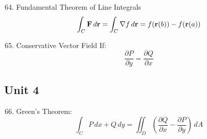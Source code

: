\documentclass[12pt]{article}
\begin{document}
\begin{enumerate}
    \setcounter{enumi}{63}

  \item Fundamental Theorem of Line Integrals
    $$\int_C \bold{F}\,d\bold{r}=\int_C \nabla f\,d\bold{r}=f(\bold{r}(b))-f(\bold{r}(a))$$

  \item Conservative Vector Field If:
    $$\frac{\partial P}{\partial y}=\frac{\partial Q}{\partial x}$$

\end{enumerate}

\subsection{Unit 4}

\begin{enumerate}
    \setcounter{enumi}{65}

  \item Green's Theorem:
    $$\int_C P\,dx+Q\,dy=\iint_D \left(\frac{\partial Q}{\partial x} - \frac{\partial P}{\partial y}\right)\,dA$$

\end{enumerate}
\end{document}
